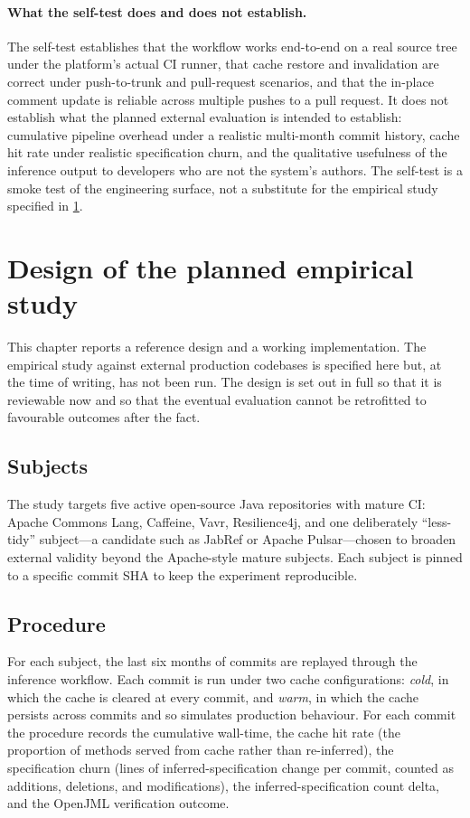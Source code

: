 \paragraph{What the self-test does and does not establish.} The self-test
establishes that the workflow works end-to-end on a real source tree under the
platform's actual CI runner, that cache restore and invalidation are correct
under push-to-trunk and pull-request scenarios, and that the in-place comment
update is reliable across multiple pushes to a pull request. It does not
establish what the planned external evaluation is intended to establish:
cumulative pipeline overhead under a realistic multi-month commit history, cache
hit rate under realistic specification churn, and the qualitative usefulness of
the inference output to developers who are not the system's authors. The
self-test is a smoke test of the engineering surface, not a substitute for the
empirical study specified in \cref{sec:ci-empirical}.

\section{Design of the planned empirical study}
\label{sec:ci-empirical}

This chapter reports a reference design and a working implementation. The
empirical study against external production codebases is specified here but, at
the time of writing, has not been run. The design is set out in full so that it
is reviewable now and so that the eventual evaluation cannot be retrofitted to
favourable outcomes after the fact.

\subsection{Subjects}

The study targets five active open-source Java repositories with mature CI:
Apache Commons Lang, Caffeine, Vavr, Resilience4j, and one deliberately
``less-tidy'' subject---a candidate such as JabRef or Apache Pulsar---chosen to
broaden external validity beyond the Apache-style mature subjects. Each subject is
pinned to a specific commit SHA to keep the experiment reproducible.

\subsection{Procedure}

For each subject, the last six months of commits are replayed through the
inference workflow. Each commit is run under two cache configurations:
\emph{cold}, in which the cache is cleared at every commit, and \emph{warm}, in
which the cache persists across commits and so simulates production behaviour. For
each commit the procedure records the cumulative wall-time, the cache hit rate
(the proportion of methods served from cache rather than re-inferred), the
specification churn (lines of inferred-specification change per commit, counted as
additions, deletions, and modifications), the inferred-specification count delta,
and the OpenJML verification outcome.

